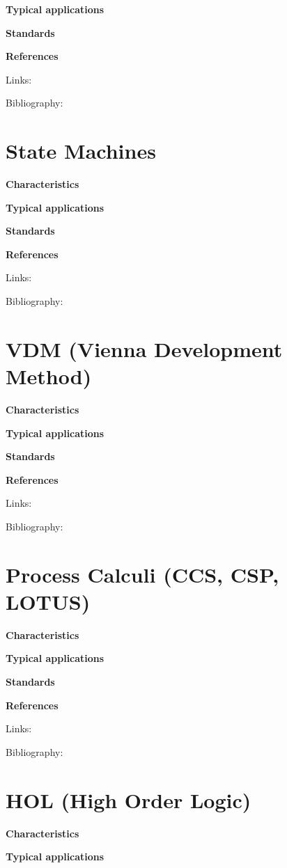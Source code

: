 \documentclass{./template/openetcs2}
\begin{document}
	\textbf{Typical applications}


	\textbf{Standards}


	\textbf{References}

Links:



Bibliography:

\section{State Machines}


	\textbf{Characteristics}


	\textbf{Typical applications}


	\textbf{Standards}


	\textbf{References}

Links:



Bibliography:

\section{VDM (Vienna Development Method)}


	\textbf{Characteristics}


	\textbf{Typical applications}


	\textbf{Standards}


	\textbf{References}

Links:



Bibliography:

\section{Process Calculi (CCS, CSP, LOTUS) }


	\textbf{Characteristics}


	\textbf{Typical applications}


	\textbf{Standards}


	\textbf{References}

Links:



Bibliography:

\section{HOL (High Order Logic)}


	\textbf{Characteristics}


	\textbf{Typical applications}
\end{document}
